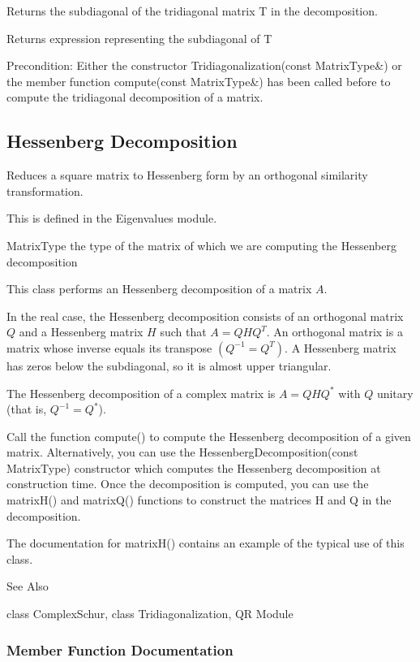 Returns the subdiagonal of the tridiagonal matrix T in the decomposition. 

Returns expression representing the subdiagonal of T

Precondition:
Either the constructor Tridiagonalization(const MatrixType\&) or the member function compute(const MatrixType\&) has been called before to compute the tridiagonal decomposition of a matrix.










\newpage
\subsection{Hessenberg Decomposition}
\label{Hessenberg Decomposition}

Reduces a square matrix to Hessenberg form by an orthogonal similarity transformation. 

This is defined in the Eigenvalues module.

MatrixType the type of the matrix of which we are computing the Hessenberg decomposition 

This class performs an Hessenberg decomposition of a matrix $A$. 

In the real case, the Hessenberg decomposition consists of an orthogonal matrix $Q$ and a Hessenberg matrix $H$ such that $A = Q H Q^T$. An orthogonal matrix is a matrix whose inverse equals its transpose $(Q^{-1} = Q^T)$. A Hessenberg matrix has zeros below the subdiagonal, so it is almost upper triangular. 

The Hessenberg decomposition of a complex matrix is $A = Q H Q^*$ with $Q$ unitary (that is, $Q^{-1} = Q^*$).

Call the function compute() to compute the Hessenberg decomposition of a given matrix. Alternatively, you can use the HessenbergDecomposition(const MatrixType) constructor which computes the Hessenberg decomposition at construction time. Once the decomposition is computed, you can use the matrixH() and matrixQ() functions to construct the matrices H and Q in the decomposition.

The documentation for matrixH() contains an example of the typical use of this class.

See Also

class ComplexSchur, class Tridiagonalization, QR Module 

\subsubsection{Member Function Documentation}

